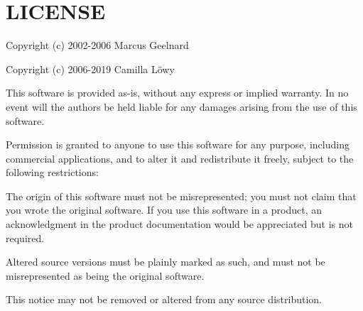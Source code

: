 \chapter{LICENSE }
\hypertarget{md__c_1_2_users_2manza_2_desktop_2_u_n_i_v_e_r_s_i_d_a_d_2_i_g_2_intro_01_open_g_l_2libs_2glfw_2_l_i_c_e_n_s_e}{}\label{md__c_1_2_users_2manza_2_desktop_2_u_n_i_v_e_r_s_i_d_a_d_2_i_g_2_intro_01_open_g_l_2libs_2glfw_2_l_i_c_e_n_s_e}
Copyright (c) 2002-\/2006 Marcus Geelnard

Copyright (c) 2006-\/2019 Camilla Löwy

This software is provided \textquotesingle{}as-\/is\textquotesingle{}, without any express or implied warranty. In no event will the authors be held liable for any damages arising from the use of this software.

Permission is granted to anyone to use this software for any purpose, including commercial applications, and to alter it and redistribute it freely, subject to the following restrictions:\+


\begin{DoxyEnumerate}
\item The origin of this software must not be misrepresented; you must not claim that you wrote the original software. If you use this software in a product, an acknowledgment in the product documentation would be appreciated but is not required.
\item Altered source versions must be plainly marked as such, and must not be misrepresented as being the original software.
\item This notice may not be removed or altered from any source distribution. 
\end{DoxyEnumerate}